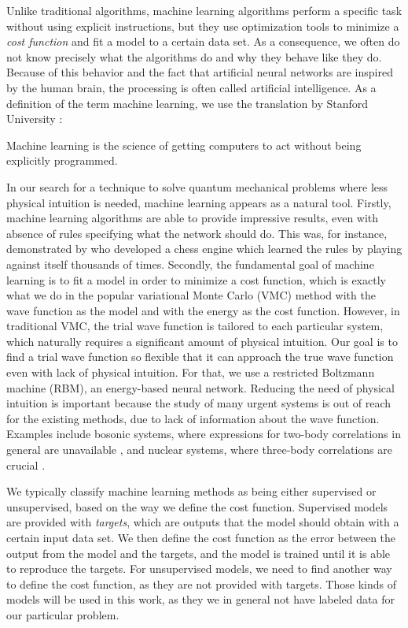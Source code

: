 Unlike traditional algorithms, machine learning algorithms perform a specific task without using explicit instructions, but they use optimization tools to minimize a \textit{cost function} and fit a model to a certain data set. As a consequence, we often do not know precisely what the algorithms do and why they behave like they do. Because of this behavior and the fact that artificial neural networks are inspired by the human brain, the processing is often called artificial intelligence. As a definition of the term machine learning, we use the translation by Stanford University \supercite{noauthor_machine_nodate}:

\begin{shadequote}{}
	Machine learning is the science of getting computers to act without being explicitly programmed.
\end{shadequote}

In our search for a technique to solve quantum mechanical problems where less physical intuition is needed, machine learning appears as a natural tool. Firstly, machine learning algorithms are able to provide impressive results, even with absence of rules specifying what the network should do. This was, for instance, demonstrated by \citet{silver2017mastering} who developed a chess engine which learned the rules by playing against itself thousands of times. Secondly, the fundamental goal of machine learning is to fit a model in order to minimize a cost function, which is exactly what we do in the popular variational Monte Carlo (VMC) method with the wave function as the model and with the energy as the cost function. However, in traditional VMC, the trial wave function is tailored to each particular system, which naturally requires a significant amount of physical intuition. Our goal is to find a trial wave function so flexible that it can approach the true wave function even with lack of physical intuition. For that, we use a restricted Boltzmann machine (RBM), an energy-based neural network. Reducing the need of physical intuition is important because the study of many urgent systems is out of reach for the existing methods, due to lack of information about the wave function. Examples include bosonic systems, where expressions for two-body correlations in general are unavailable \supercite{holzmann_pair_1999}, and nuclear systems, where three-body correlations are crucial \supercite{sauer_three-nucleon_2014}.

We typically classify machine learning methods as being either supervised or unsupervised, based on the way we define the cost function. Supervised models are provided with \textit{targets}, which are outputs that the model should obtain with a certain input data set. We then define the cost function as the error between the output from the model and the targets, and the model is trained until it is able to reproduce the targets. For unsupervised models, we need to find another way to define the cost function, as they are not provided with targets. Those kinds of models will be used in this work, as they we in general not have labeled data for our particular problem.

